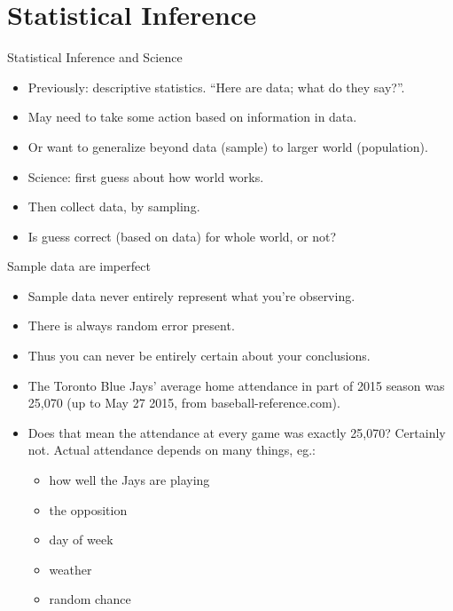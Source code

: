 \documentclass[ignorenonframetext,]{beamer}
\providecommand{\tightlist}{%
  \setlength{\itemsep}{0pt}\setlength{\parskip}{0pt}}
\begin{document}
\hypertarget{statistical-inference}{%
\section{Statistical Inference}\label{statistical-inference}}

\begin{frame}{Statistical Inference and Science}
\protect\hypertarget{statistical-inference-and-science}{}

\begin{itemize}
\tightlist
\item
  Previously: descriptive statistics. ``Here are data; what do they
  say?''.
\item
  May need to take some action based on information in data.
\item
  Or want to generalize beyond data (sample) to larger world
  (population).
\item
  Science: first guess about how world works.
\item
  Then collect data, by sampling.
\item
  Is guess correct (based on data) for whole world, or not?
\end{itemize}

\end{frame}

\begin{frame}{Sample data are imperfect}
\protect\hypertarget{sample-data-are-imperfect}{}

\begin{itemize}
\tightlist
\item
  Sample data never entirely represent what you're observing.
\item
  There is always random error present.
\item
  Thus you can never be entirely certain about your conclusions.
\item
  The Toronto Blue Jays' average home attendance in part of 2015 season
  was 25,070 (up to May 27 2015, from baseball-reference.com).
\item
  Does that mean the attendance at every game was exactly 25,070?
  Certainly not. Actual attendance depends on many things, eg.:

  \begin{itemize}
  \tightlist
  \item
    how well the Jays are playing
  \item
    the opposition
  \item
    day of week
  \item
    weather
  \item
    random chance
  \end{itemize}
\end{itemize}

\end{frame}
\end{document}
